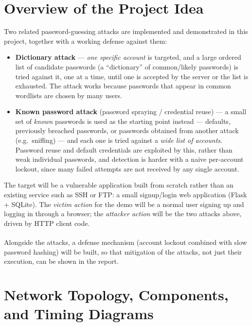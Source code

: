 \documentclass[11pt]{article}
\begin{document}
\section{Overview of the Project Idea}

Two related password-guessing attacks are implemented and demonstrated in this
project, together with a working defense against them:

\begin{itemize}[leftmargin=*]
  \item \textbf{Dictionary attack} --- \emph{one specific account} is targeted, and a
    large ordered list of candidate passwords (a ``dictionary'' of common/likely
    passwords) is tried against it, one at a time, until one is accepted by the
    server or the list is exhausted. The attack works because passwords that appear
    in common wordlists are chosen by many users.
  \item \textbf{Known password attack} (password spraying / credential reuse) --- a
    small set of \emph{known} passwords is used as the starting point instead ---
    defaults, previously breached passwords, or passwords obtained from another
    attack (e.g.\ sniffing) --- and each one is tried against a \emph{wide list of
    accounts}. Password reuse and default credentials are exploited by this, rather
    than weak individual passwords, and detection is harder with a naive per-account
    lockout, since many failed attempts are not received by any single account.
\end{itemize}

The target will be a
vulnerable application built from scratch rather than an existing service such as SSH
or FTP: a small signup/login web application (Flask + SQLite). The \emph{victim
action} for the demo will be a normal user signing up and logging in through a
browser; the \emph{attacker action} will be the two attacks above, driven by HTTP
client code. \\ \\
Alongside the attacks, a defense mechanism (account lockout combined with slow
password hashing) will be built, so that mitigation of the attacks, not just their
execution, can be shown in the report.

\section{Network Topology, Components, and Timing Diagrams}
\end{document}
